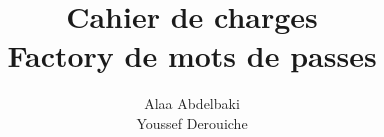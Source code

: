 \documentclass{article}
\author{Alaa Abdelbaki\\Youssef Derouiche}
\title{Cahier de charges\\Factory de mots de passes}
\date{}
\begin{document}
\begin{titlepage}
    \maketitle
\end{titlepage}
\newpage
\tableofcontents

\newpage


\newpage


\newpage


\newpage


\newpage


\newpage





\end{document}

